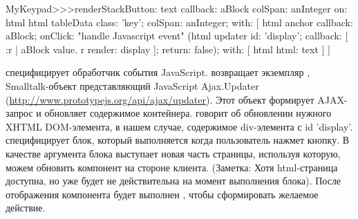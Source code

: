 \documentclass[a4paper,10pt,twoside]{book}
\begin{document}

\begin{code}{}
MyKeypad>>>renderStackButton: text callback: aBlock colSpan: anInteger on: html 
	html tableData
		class: 'key';
		colSpan: anInteger;
		with: [
			html anchor
				callback: aBlock;
				onClick:				"handle Javascript event"
					(html updater
						id: 'display';
						callback: [ :r |
							aBlock value.
							r render: display ];
						return: false);
				with: [ html html: text ] ]
\end{code}


 специфицирует обработчик события JavaScript.
 возвращает экземпляр , Smalltalk-объект
представляющий JavaScript Ajax.Updater
(\url{http://www.prototypejs.org/api/ajax/updater}). Этот объект формирует
AJAX-запрос и обновляет содержимое контейнера.
 говорит об обновлении нужного XHTML DOM-элемента, в нашем случае,
содержимое div-элемента с id 'display'.
 специфицирует блок, который выполняется когда пользователь
нажмет кнопку. В качестве аргумента блока выступает новая часть страницы,
используя которую, можем обновить компонент на стороне клиента.
(Заметка: Хотя html-страница доступна, но уже будет не действительна на
момент выполнения блока).
После отображения компонента будет выполнен ,
чтобы сформировать желаемое действие.
\end{document}
